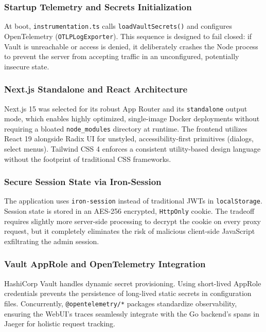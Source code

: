 \subsubsection{Startup Telemetry and Secrets Initialization}
At boot, \texttt{instrumentation.ts} calls \texttt{loadVaultSecrets()} and configures OpenTelemetry (\texttt{OTLPLogExporter}). This sequence is designed to fail closed: if Vault is unreachable or access is denied, it deliberately crashes the Node process to prevent the server from accepting traffic in an unconfigured, potentially insecure state.

\subsubsection{Next.js Standalone and React Architecture}
Next.js 15 was selected for its robust App Router and its \texttt{standalone} output mode, which enables highly optimized, single-image Docker deployments without requiring a bloated \texttt{node\_modules} directory at runtime. The frontend utilizes React 19 alongside Radix UI for unstyled, accessibility-first primitives (dialogs, select menus). Tailwind CSS 4 enforces a consistent utility-based design language without the footprint of traditional CSS frameworks.

\subsubsection{Secure Session State via Iron-Session}
The application uses \texttt{iron-session} instead of traditional JWTs in \texttt{localStorage}. Session state is stored in an AES-256 encrypted, \texttt{HttpOnly} cookie. The tradeoff requires slightly more server-side processing to decrypt the cookie on every proxy request, but it completely eliminates the risk of malicious client-side JavaScript exfiltrating the admin session.

\subsubsection{Vault AppRole and OpenTelemetry Integration}
HashiCorp Vault handles dynamic secret provisioning. Using short-lived AppRole credentials prevents the persistence of long-lived static secrets in configuration files. Concurrently, \texttt{@opentelemetry/*} packages standardize observability, ensuring the WebUI's traces seamlessly integrate with the Go backend's spans in Jaeger for holistic request tracking.


